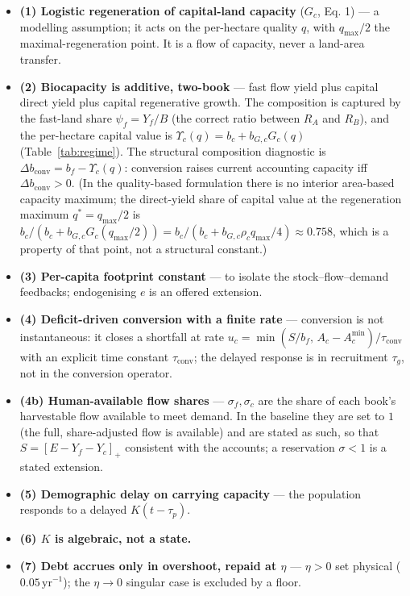 \documentclass[11pt]{article}
\begin{document}
\begin{itemize}
\item \textbf{(1) Logistic regeneration of capital-land capacity} ($G_c$, Eq. 1) --- a modelling assumption; it acts on the per-hectare quality $q$, with $q_{\max}/2$ the maximal-regeneration point. It is a flow of capacity, never a land-area transfer.
\item \textbf{(2) Biocapacity is additive, two-book} --- fast flow yield plus capital direct yield plus capital regenerative growth. The composition is captured by the fast-land share $\psi_f=Y_f/B$ (the correct ratio between $R_A$ and $R_B$), and the per-hectare capital value is $\Upsilon_c(q)=b_c+b_{G,c}G_c(q)$ (Table~\ref{tab:regime}). The structural composition diagnostic is $\Delta b_{\mathrm{conv}}=b_f-\Upsilon_c(q)$: conversion raises current accounting capacity iff $\Delta b_{\mathrm{conv}}>0$. (In the quality-based formulation there is no interior area-based capacity maximum; the direct-yield share of capital value at the regeneration maximum $q^*=q_{\max}/2$ is $b_c/(b_c+b_{G,c}G_c(q_{\max}/2))=b_c/(b_c+b_{G,c}\rho_c q_{\max}/4)\approx0.758$, which is a property of that point, not a structural constant.)
\item \textbf{(3) Per-capita footprint constant} --- to isolate the stock--flow--demand feedbacks; endogenising $e$ is an offered extension.
\item \textbf{(4) Deficit-driven conversion with a finite rate} --- conversion is not instantaneous: it closes a shortfall at rate $u_c=\min(S/b_f,\,A_c-A_c^{\min})/\tau_{\mathrm{conv}}$ with an explicit time constant $\tau_{\mathrm{conv}}$; the delayed response is in recruitment $\tau_g$, not in the conversion operator.
\item \textbf{(4b) Human-available flow shares} --- $\sigma_f,\sigma_c$ are the share of each book's harvestable flow available to meet demand. In the baseline they are set to $1$ (the full, share-adjusted flow is available) and are stated as such, so that $S=[E-Y_f-Y_c]_+$ consistent with the accounts; a reservation $\sigma<1$ is a stated extension.
\item \textbf{(5) Demographic delay on carrying capacity} --- the population responds to a delayed $K(t-\tau_p)$.
\item \textbf{(6) $K$ is algebraic, not a state.}
\item \textbf{(7) Debt accrues only in overshoot, repaid at $\eta$} --- $\eta>0$ set physical ($0.05\,\text{yr}^{-1}$); the $\eta\to0$ singular case is excluded by a floor.

\end{itemize}
\end{document}
